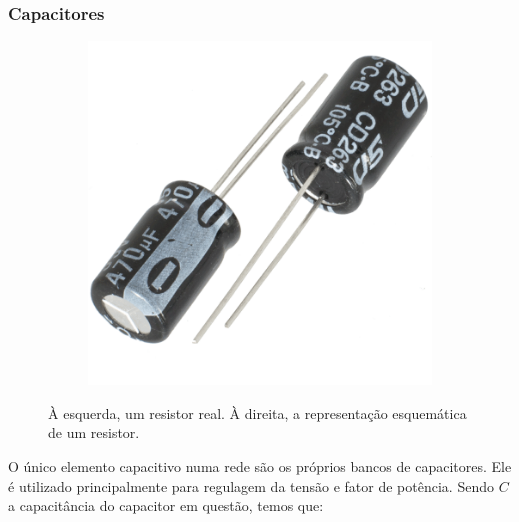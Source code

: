 \subsubsection*{Capacitores}

\begin{figure}
    \centering
    \begin{subfigure}[b]{0.3\textwidth}
        \centering
        \includegraphics[width=\textwidth]{anexos/capacitor.png}
    \end{subfigure}
    \hspace{1cm}
    \begin{subfigure}[b]{0.3\textwidth}
        \centering
    \end{subfigure}
    \caption{À esquerda, um resistor real. À direita, a representação esquemática de um resistor.}
    \label{fig:three graphs}
\end{figure}


O único elemento capacitivo numa rede são os próprios bancos de capacitores.
Ele é utilizado principalmente para regulagem da tensão e fator de
potência. Sendo $C$ a capacitância do capacitor em questão, temos
que:

